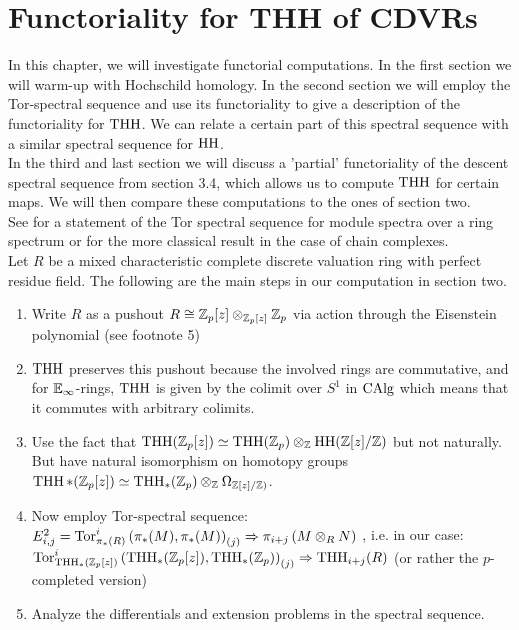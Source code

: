 \chapter{Functoriality for THH of CDVRs}
In this chapter, we will investigate functorial computations. In the first section we will warm-up with Hochschild homology. In the second section we will employ the Tor-spectral sequence and use its functoriality to give a description of the functoriality for $\operatorname{THH}$. We can relate a certain part of this spectral sequence with a similar spectral sequence for $\operatorname{HH}$. \\ In the third and last section we will discuss a 'partial' functoriality of the descent spectral sequence from section 3.4, which allows us to compute $\operatorname{THH}$ for certain maps. We will then compare these computations to the ones of section two.\\
See \cite[~Proposition 7.2.1.19]{lurie2017higher} for a statement of the Tor spectral sequence for module spectra over a ring spectrum 
or \cite[\href{https://stacks.math.columbia.edu/tag/061Y}{Tag 061Y}]{stacks-project} for the more classical result in the case of chain complexes.
\\
Let $R$ be a mixed characteristic complete discrete valuation ring with perfect residue field. The following are the main steps in our computation in section two.
\begin{enumerate}
    \item Write $R$ as a pushout $R\cong\mathbb{Z}_p[z]\otimes_{\mathbb{Z}_p[z]}\mathbb{Z}_p$ via action through the Eisenstein polynomial (see footnote 5)
    \item $\operatorname{THH}$ preserves this pushout because the involved rings are commutative, and for $\mathbb{E}_\infty$-rings, $\operatorname{THH}$ is given by the colimit over $S^1$ in $\operatorname{CAlg}$ which means that it commutes with arbitrary colimits.
    \item Use the fact that $\operatorname{THH}(\mathbb{Z}_p[z])\simeq \operatorname{THH}(\mathbb{Z}_p)\otimes_{\mathbb{Z}} \operatorname{HH}(\mathbb{Z}[z]/\mathbb{Z})$ but not naturally. But have natural isomorphism on homotopy groups
    $\operatorname{THH}*(\mathbb{Z}_p[z])\simeq \operatorname{THH}_*(\mathbb{Z}_p)\otimes_{\mathbb{Z}} \Omega_{\mathbb{Z}[z]/\mathbb{Z})}$.
    \item Now employ Tor-spectral sequence:\\
     $E^2_{i,j}=\operatorname{Tor}_{\pi_*(R)}^i\left( \pi_*(M), \pi_*(M)\right)_{(j)}\Rightarrow \pi_{i+j}\left( M\otimes_R N \right)$
    , i.e. in our case: 
    \\
    $\operatorname{Tor}_{\operatorname{THH}_*(\mathbb{Z}_p[z])}^i\left( \operatorname{THH}_*(\mathbb{Z}_p[z]),\operatorname{THH}_*(\mathbb{Z}_p)\right)_{(j)}\Rightarrow \operatorname{THH}_{i+j}(R)$ (or rather the $p$-completed version)
    \item Analyze the differentials and extension problems in the spectral sequence.
\end{enumerate}



